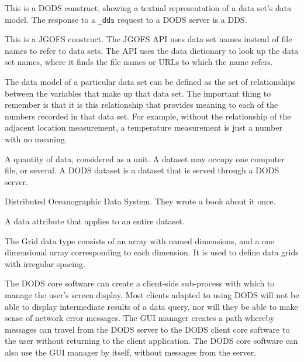 This is a DODS construct, showing a textual representation of a data
set's data model. The response to a {\tt \_dds} request to a DODS
server is a DDS.


This is a JGOFS construct. The JGOFS API uses data set names instead
of file names to refer to data sets. The API uses the data dictionary
to look up the data set names, where it finds the file names or URLs
to which the name refers.


The data model of a particular data set can be defined as the set of
relationships between the variables that make up that data set. The
important thing to remember is that it is this relationship that
provides meaning to each of the numbers recorded in that data set. For
example, without the relationship of the adjacent location
measurement, a temperature measurement is just a number with no
meaning.


A quantity of data, considered as a unit.  A dataset may occupy one
computer file, or several.  A DODS dataset is a dataset that is served
through a DODS server.


Distributed Oceanographic Data System. They wrote a book about it 
once.


A data attribute that applies to an entire dataset.


The Grid data type consists of an array with named dimensions, and a
one dimensional array corresponding to each dimension. It is used to
define data grids with irregular spacing.


The DODS core software can create a client-side sub-process with which
to manage the user's screen display. Most clients adapted to using DODS
will not be able to display intermediate results of a data query, nor will
they be able to make sense of network error messages. The GUI manager
creates a path whereby messages can travel from the DODS server to the
DODS client core software to the user without returning to the client
application. The DODS core software can also use the GUI manager by
itself, without messages from the server.


